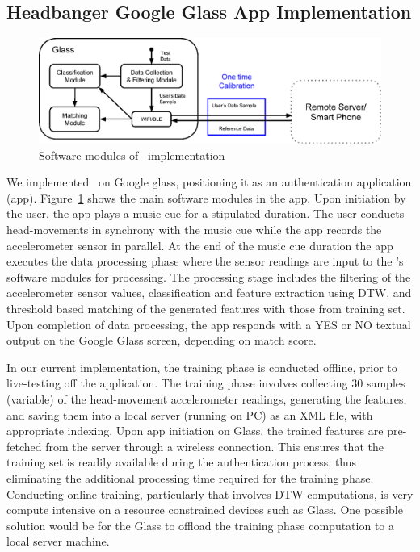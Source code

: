 \subsection{Headbanger Google Glass App Implementation}

\begin{figure}[t]
\centering
\includegraphics [width=\columnwidth]{figure/software_arch.eps}
\caption{Software modules of \systemname~implementation}
\vspace{25 pt}
\label{fig:glass-softwarearch}
\end{figure}

We implemented \systemname~on Google glass, positioning it as an 
authentication application (app). 
Figure~\ref{fig:glass-softwarearch} shows the main software modules in the 
app. Upon initiation by the user, the app plays a music cue for a stipulated 
duration. The user conducts head-movements in synchrony with the music cue 
while the app records the accelerometer sensor in parallel. At the end of the 
music cue duration the app executes the data processing phase where the 
sensor readings are input to the \systemname's software modules for 
processing. The processing stage includes the filtering of the accelerometer 
sensor values, classification and feature extraction using DTW, and threshold 
based matching of the generated features with those from training set.
Upon completion of data processing, the app responds with a YES or NO textual 
output on the Google Glass screen, depending on match score.

In our current implementation, the training phase is conducted offline, prior 
to live-testing off the application.
The training phase involves collecting 30 samples (variable) of the 
head-movement accelerometer readings, generating the features, and saving them 
into a local server (running on PC) as an XML file, with appropriate indexing. 
Upon app initiation on Glass, the trained features are pre-fetched from 
the server through a wireless connection. This ensures that the training set 
is readily available during the authentication process, thus eliminating the 
additional processing time required for the training phase.
Conducting online training, particularly that involves DTW computations, is 
very compute intensive on a resource constrained devices such as Glass. 
One possible solution would be for the Glass to offload the 
training phase computation to a local server machine.

